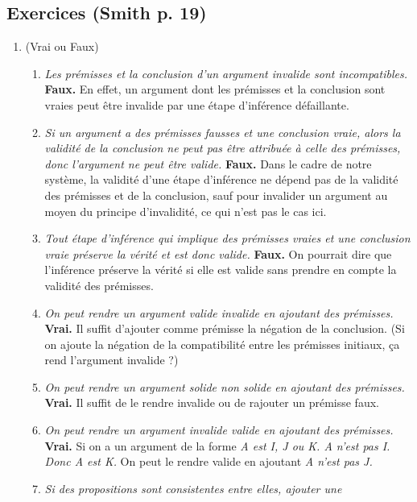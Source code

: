 \documentclass[fleqn,a4paper,nobib]{tufte-handout}
\begin{document}
\subsection*{Exercices (Smith p. 19)}

\begin{enumerate}[label=(\alph*)]
    \item (Vrai ou Faux)
    \begin{enumerate}[label=(\arabic*)]
        \item \textit{Les prémisses et la conclusion d'un argument invalide sont
        incompatibles.} \textbf{Faux.} En effet, un argument dont les prémisses
        et la conclusion sont vraies peut être invalide par une étape d'inférence
        défaillante.
        \item \textit{Si un argument a des prémisses fausses et une conclusion vraie,
        alors la validité de la conclusion ne peut pas être attribuée à
        celle des prémisses, donc l'argument ne peut être valide.} \textbf{Faux.}
        Dans le cadre de notre système, la validité d'une étape d'inférence
        ne dépend pas de la validité des prémisses et de la conclusion, sauf
        pour invalider un argument au moyen du principe d'invalidité, ce
        qui n'est pas le cas ici.
        \item \textit{Tout étape d'inférence qui implique des prémisses vraies et une
        conclusion vraie préserve la vérité et est donc valide.} \textbf{Faux.}
        On pourrait dire que l'inférence préserve la vérité si elle est valide
        sans prendre en compte la validité des prémisses.
        \item \textit{On peut rendre un argument valide invalide en ajoutant des prémisses.}
        \textbf{Vrai.} Il suffit d'ajouter comme prémisse la négation de la conclusion.
        (Si on ajoute la négation de la compatibilité entre les prémisses initiaux,
        ça rend l'argument invalide ?)
        \item \textit{On peut rendre un argument solide non solide en ajoutant des prémisses.}
        \textbf{Vrai.} Il suffit de le rendre invalide ou de rajouter un prémisse faux.
        \item \textit{On peut rendre un argument invalide valide en ajoutant des prémisses.}
        \textbf{Vrai.} Si on a un argument de la forme \textit{A est I, J ou K. A n'est pas I. Donc A est K.}
        On peut le rendre valide en ajoutant \textit{A n'est pas J.}
        \item \textit{Si des propositions sont consistentes entre elles, ajouter une
}
\end{enumerate}
\end{enumerate}
\end{document}
